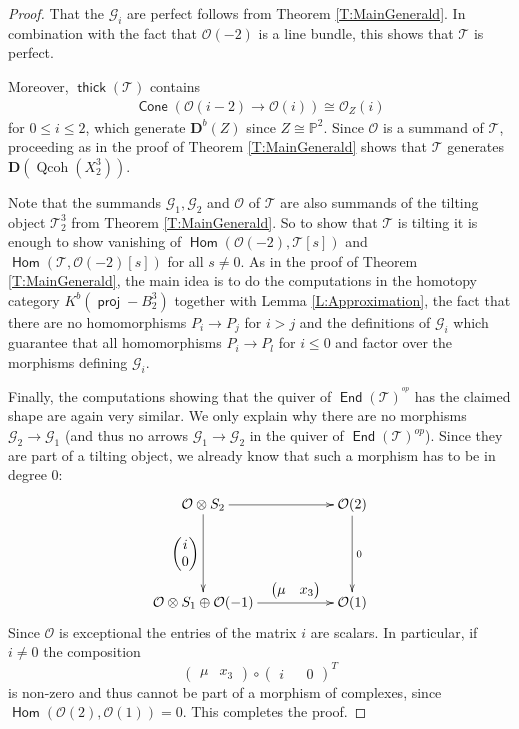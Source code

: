 \documentclass[a4paper,11pt, reqno]{amsart}
\def\P{\mathbb P}
\def\DD{\mathbf D}
\def\OO{\mathcal O}
\def\sG{\mathscr{G}}
\def\sT{\mathscr{T}}
\def\Qcoh{{\operatorname{Qcoh}}}
\newcommand{\opname}[1]{\operatorname{\mathsf{#1}}}
\newcommand{\Hom}{\opname{Hom}}
\newcommand{\End}{\opname{End}}
\newcommand{\Cone}{\opname{Cone}}
\newcommand{\op}{^{op}}
\newcommand{\thick}{\opname{thick}\nolimits}
\def\Db{\DD^b}
\newcommand{\proj}{\opname{proj}\nolimits}
\theoremstyle{plain}
\theoremstyle{definition}
\numberwithin{equation}{section}
\newlength{\arrow}
\begin{document}
\begin{proof}
    That the $\sG_i$ are perfect follows from Theorem \ref{T:MainGenerald}. In combination with the fact that  $\OO(-2)$ is a line bundle, this shows that $\sT$ is perfect.

    Moreover, $\thick(\sT)$ contains \begin{align}
        \Cone(\OO(i-2) \to \OO(i)) \cong \OO_Z(i)
    \end{align} 
    for $0 \leq i \leq 2$, which generate $\Db(Z)$ since $Z \cong \P^2$. Since $\OO$ is a summand of $\sT$, proceeding as in the proof of Theorem \ref{T:MainGenerald} shows that $\sT$ generates $\DD(\Qcoh(X_2^3))$.

    Note that the summands $\sG_1, \sG_2$ and $\OO$ of $\sT$ are also summands of the tilting object $\sT_2^3$ from Theorem \ref{T:MainGenerald}. So to show that $\sT$ is tilting it is enough to show vanishing of $\Hom(\OO(-2), \sT[s])$ and $\Hom(\sT, \OO(-2)[s])$ for all $s \neq 0$. As in the proof of Theorem \ref{T:MainGenerald}, the main idea is to do the computations in the homotopy category $K^b(\proj-B_2^3)$ together with Lemma \ref{L:Approximation}, the fact that there are no homomorphisms $P_i \to P_j$ for $i>j$ and the definitions of $\sG_i$ which guarantee that all homomorphisms $P_i \to P_l$ for $i\leq 0$ and factor over the morphisms defining $\sG_i$.

    Finally, the computations showing that the quiver of $\End(\sT )^{\op}$ has the claimed shape are again very similar. 
    We only explain why there are no morphisms  $\sG_2 \to \sG_1$ (and thus no arrows $\sG_1 \to \sG_2$ in the quiver of $\End(\sT)\op$). Since they are part of a tilting object, we already know that such a morphism has to be in degree $0$:
    \begin{align*}
        \xymatrix{
    \OO \otimes S_2 \ar[dd]_{{\begin{pmatrix} i \\ 0 \end{pmatrix}}} \ar[rr] && \OO(2) \ar[dd]^{0} \\ \\
    \OO \otimes S_1 \oplus \OO(-1) \ar[rr]^-{{  \begin{pmatrix} \mu & x_3 \end{pmatrix}}} && \OO(1) }
    \end{align*}
    Since $\OO$ is exceptional the entries of the matrix $i$ are scalars. In particular, if $i \neq 0$ the composition $$  \begin{pmatrix} \mu & x_3 \end{pmatrix} \circ \begin{pmatrix}
        i && 0
    \end{pmatrix}^T$$ 
    is non-zero and thus cannot be part of a morphism of complexes, since $\Hom(\OO(2), \OO(1))=0$. This completes the proof.
\end{proof}
\end{document}
